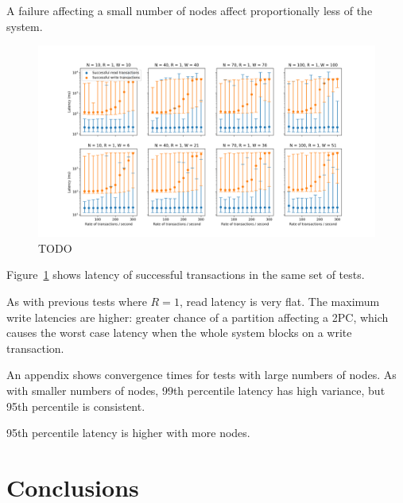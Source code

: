 \documentclass[12pt,a4paper,twoside,openany]{report}
\begin{document}
A failure affecting a small number of nodes affect proportionally less of the system.

\begin{figure}[ht]
\centerline{\includegraphics[width=\paperwidth]{figs/big-n-latency.png}}
\caption{TODO}
\label{big-n-latency}
\end{figure}

Figure~\ref{big-n-latency} shows latency of successful transactions in the same set of tests.

As with previous tests where $R = 1$, read latency is very flat. The maximum write latencies are higher: greater chance of a partition affecting a 2PC, which causes the worst case latency when the whole system blocks on a write transaction.

An appendix shows convergence times for tests with large numbers of nodes. As with smaller numbers of nodes, 99th percentile latency has high variance, but 95th percentile is consistent.

95th percentile latency is higher with more nodes. %







\chapter{Conclusions}
\end{document}
